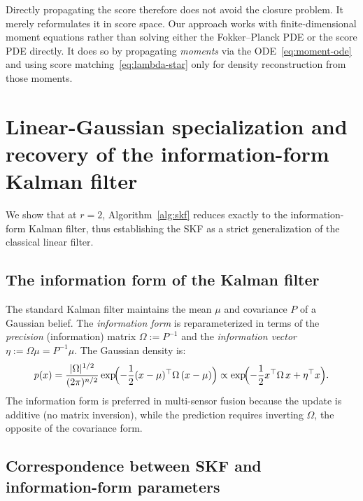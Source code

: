 \documentclass{article}
\theoremstyle{definition}
\begin{document}
Directly propagating the score therefore does not avoid the
closure problem. It merely reformulates it in score space.
Our approach works with finite-dimensional moment equations rather than
solving either the Fokker--Planck PDE or the score PDE directly. It does
so by propagating \emph{moments} via the
ODE~\eqref{eq:moment-ode} and using score matching~\eqref{eq:lambda-star}
only for density reconstruction from those moments.

\section{Linear-Gaussian specialization and recovery of the information-form Kalman filter}
\label{app:gaussian}

We show that at $r = 2$, Algorithm~\ref{alg:skf} reduces exactly to the
information-form Kalman filter, thus establishing the SKF as a strict
generalization of the classical linear filter.

\subsection{The information form of the Kalman filter}\label{app:info-form}

The standard Kalman filter maintains the mean $\mu$ and covariance $P$
of a Gaussian belief.
The \emph{information form}  is reparameterized in terms of the
\emph{precision} (information) matrix $\Omega := P^{-1}$ and the
\emph{information vector} $\eta := \Omega\mu = P^{-1}\mu$.
The Gaussian density is:
\begin{equation}\label{eq:gauss-info}
    p(x) = \frac{|\Omega|^{1/2}}{(2\pi)^{n/2}}
    \exp\!\Bigl(-\frac{1}{2}(x-\mu)^\top \Omega\,(x-\mu)\Bigr)
    \propto \exp\!\Bigl(-\frac{1}{2}x^\top\Omega\, x + \eta^\top x\Bigr).
\end{equation}
The information form is preferred in multi-sensor fusion because
the update is additive (no matrix inversion), while the prediction
requires inverting $\Omega$, the opposite of the covariance form.

\subsection{Correspondence between SKF and information-form parameters}\label{app:skf-info-corr}
\end{document}
